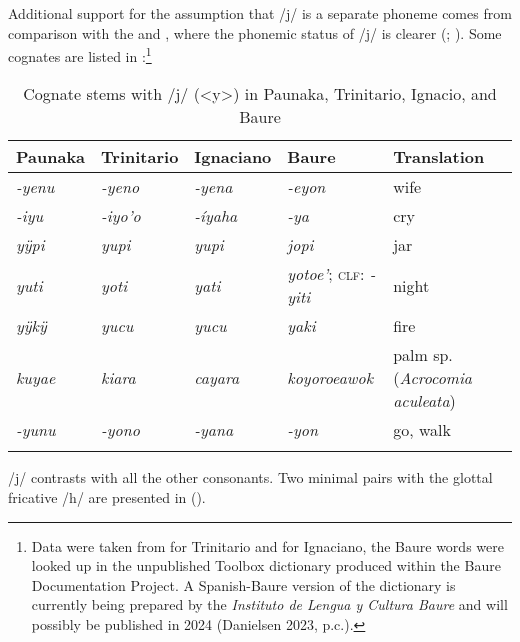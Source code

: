 Additional support for the assumption that /j/ is a separate phoneme comes from comparison with the  and , where the phonemic status of /j/ is clearer (\citealp[cf.][63]{Rose2014a}; \citealt[48--49]{Danielsen2007}). Some cognates are listed in :\footnote{Data were taken from \citet[]{Gill1993} for Trinitario and \citet[]{OttOtt1983} for Ignaciano, the Baure words were looked up in the unpublished Toolbox dictionary produced within the Baure Documentation Project. A Spanish-Baure version of the dictionary is currently being prepared by the \textit{Instituto de Lengua y Cultura Baure} and will possibly be published in 2024 (Danielsen 2023, p.c.).}


\begin{table}
\caption{Cognate stems with /j/ (<y>) in Paunaka, Trinitario, Ignacio, and Baure}

\begin{tabularx}{\textwidth}{XXXlQ}
\lsptoprule
Paunaka & Trinitario & Ignaciano & Baure & Translation \\
\midrule
\textit{-yenu} & \textit{-yeno} & \textit{-yena} & \textit{-eyon} & wife \\

\textit{-iyu} & \textit{-iyo'o} & \textit{-íyaha} & \textit{-ya} & cry \\

\textit{yÿpi} & \textit{yupi}  &  \textit{yupi}  & \textit{jopi} & jar \\

\textit{yuti} & \textit{yoti} & \textit{yati} & \textit{yotoe'}; \textsc{clf}: \textit{-yiti} & night \\

\textit{yÿkÿ} & \textit{yucu} & \textit{yucu} & \textit{yaki} & fire \\

\textit{kuyae} & \textit{kiara}  & \textit{cayara} &  \textit{koyoroeawok} & palm sp. (\textit{Acrocomia aculeata}) \\

\textit{-yunu} & \textit{-yono}  & \textit{-yana} &  \textit{-yon} & go, walk \\
\lspbottomrule
\end{tabularx}

\label{table:/j/}
\end{table}

/j/ contrasts with all the other consonants. Two minimal pairs with the glottal fricative /h/ are presented in ().

